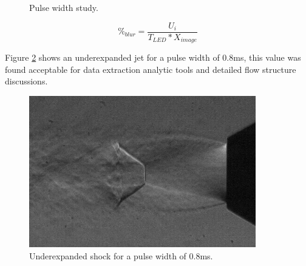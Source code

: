 \begin{figure}[H]
  \centering
  \hfill
  \caption{Pulse width study.}
  \label{fig:pulse}
\end{figure}

\begin{equation} \label{eqn:blur}
\%_{blur} = \frac{U_i}{T_{LED}*X_{image}}
\end{equation}

Figure \ref{fig:pulse_f} shows an underexpanded jet for a pulse width of 0.8ms, this value was found acceptable for data extraction analytic tools and detailed flow structure discussions.


\begin{figure}[H] 
	\centering
	\includegraphics[width=0.88\textwidth]{pulse.png} 
	\caption{Underexpanded shock for a pulse width of 0.8ms.}
	\label{fig:pulse_f}
\end{figure}


